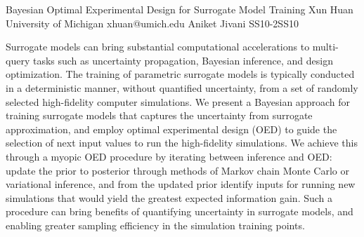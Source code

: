 \begin{talk}
   {Bayesian Optimal Experimental Design for Surrogate Model Training}%
  {Xun Huan}%
  {University of Michigan}%
  {xhuan@umich.edu}%
  {Aniket Jivani}%
{}{}{SS10-2}{SS10}

			
Surrogate models can bring substantial computational accelerations to multi-query tasks such as uncertainty propagation, Bayesian inference, and design optimization. The training of parametric surrogate models is typically conducted in a deterministic manner, without quantified uncertainty, from a set of randomly selected high-fidelity computer simulations. 
We present a Bayesian approach for training surrogate models that captures the uncertainty from surrogate approximation, and employ optimal experimental design (OED) to guide the selection of next input values to run the high-fidelity simulations. We achieve this through a myopic OED procedure by iterating between inference and OED: update the prior to posterior through methods of Markov chain Monte Carlo or variational inference, and from the updated prior identify inputs for running new simulations that would yield the greatest expected information gain. Such a procedure can bring benefits of quantifying uncertainty in surrogate models, and enabling greater sampling efficiency in the simulation training points. 


\medskip


\end{talk}


